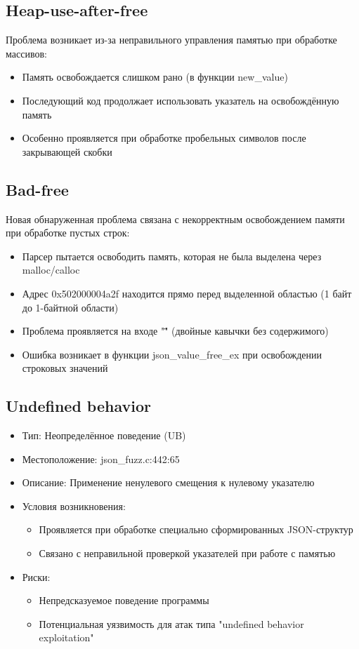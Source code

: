     \subsection{Heap-use-after-free}
    Проблема возникает из-за неправильного управления памятью при обработке массивов:
    \begin{itemize}
        \item Память освобождается слишком рано (в функции new\_value)
        \item Последующий код продолжает использовать указатель на освобождённую память
        \item Особенно проявляется при обработке пробельных символов после закрывающей скобки
    \end{itemize}

    \subsection{Bad-free}
    Новая обнаруженная проблема связана с некорректным освобождением памяти при обработке пустых строк:
    \begin{itemize}
        \item Парсер пытается освободить память, которая не была выделена через malloc/calloc
        \item Адрес 0x502000004a2f находится прямо перед выделенной областью (1 байт до 1-байтной области)
        \item Проблема проявляется на входе "\"\"" (двойные кавычки без содержимого)
        \item Ошибка возникает в функции json\_value\_free\_ex при освобождении строковых значений
    \end{itemize}

    \subsection{Undefined behavior}
    \begin{itemize}
        \item Тип: Неопределённое поведение (UB)
        \item Местоположение: json\_fuzz.c:442:65
        \item Описание: Применение ненулевого смещения к нулевому указателю
        \item Условия возникновения:
        \begin{itemize}
            \item Проявляется при обработке специально сформированных JSON-структур
            \item Связано с неправильной проверкой указателей при работе с памятью
        \end{itemize}
        \item Риски:
        \begin{itemize}
            \item Непредсказуемое поведение программы
            \item Потенциальная уязвимость для атак типа "undefined behavior exploitation"
        \end{itemize}
    \end{itemize}


